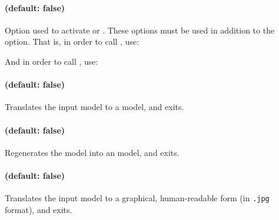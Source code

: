 \paragraph{ (default: false)}
Option used to activate \PRP{} or \PRPC{} \cite{ALNS15}.
These options must be used in addition to the  option.
That is, in order to call \PRP{}, use:


And in order to call \PRPC{}, use:





\paragraph{ (default: false)}
Translates the input model to a \hytech{} model, and exits.

\paragraph{ (default: false)}
Regenerates the model into an \imitator{} model, and exits.

\paragraph{ (default: false)}
Translates the input model to a graphical, human-readable form (in \texttt{.jpg} format), and exits.

